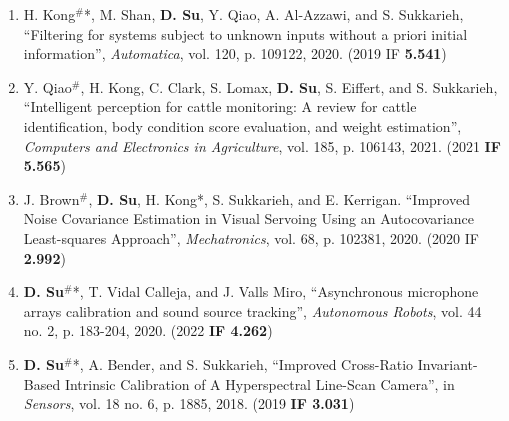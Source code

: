 \documentclass[margin,line]{res}
\begin{document}
\begin{resume}
\begin{enumerate}
\item H. Kong$^{\#}$*, M. Shan, \textbf{D. Su}, Y. Qiao, A. Al-Azzawi, and S. Sukkarieh, ``Filtering for systems subject to unknown inputs without a priori initial information'', {\it Automatica}, vol. 120, p. 109122, 2020. (2019 IF \textbf{5.541})

\item Y. Qiao$^{\#}$, H. Kong, C. Clark, S. Lomax, \textbf{D. Su}, S. Eiffert, and S. Sukkarieh, ``Intelligent perception for cattle monitoring: A review for cattle identification, body condition score evaluation, and weight estimation'', {\it Computers and Electronics in Agriculture}, vol. 185, p. 106143, 2021. (2021 \textbf{IF 5.565})

\item J. Brown$^{\#}$, \textbf{D. Su}, H. Kong*, S. Sukkarieh, and E. Kerrigan. ``Improved Noise Covariance Estimation in Visual Servoing Using an Autocovariance Least-squares Approach'', \textit{Mechatronics}, vol. 68, p. 102381, 2020. (2020 IF \textbf{2.992})

\item {\bf D. Su}$^{\#}$*, T. Vidal Calleja, and J. Valls Miro, ``Asynchronous microphone arrays calibration and sound source tracking'', {\it Autonomous Robots}, vol. 44 no. 2, p. 183-204, 2020. (2022 \textbf{IF 4.262})

\item {\bf D. Su}$^{\#}$*, A. Bender, and S. Sukkarieh, ``Improved Cross-Ratio Invariant-Based Intrinsic Calibration of A Hyperspectral Line-Scan Camera'', in {\it Sensors}, vol. 18 no. 6, p. 1885, 2018. (2019 \textbf{IF 3.031})


\end{enumerate}
\end{resume}
\end{document}
